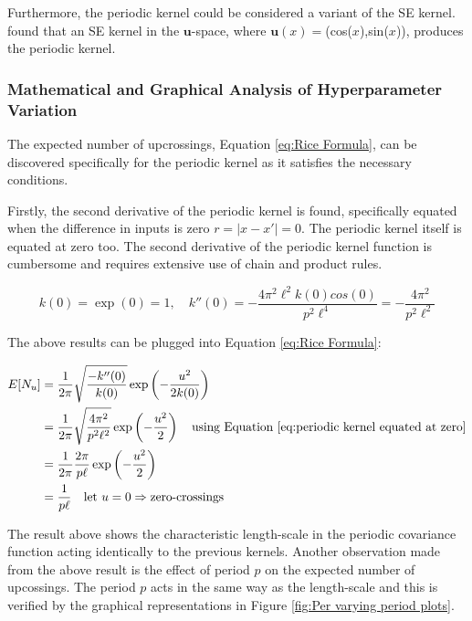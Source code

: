 \documentclass[12pt,a4paper]{article}
\begin{document}
Furthermore, the periodic kernel could be considered a variant of the SE kernel. \citet{mackay1998introduction} found that an SE kernel in the \(\mathbf{u}\)-space, where \(\mathbf{u}(x)=\)(cos(\(x\)),sin(\(x\))), produces the periodic kernel. 

\subsubsection{Mathematical and Graphical Analysis of Hyperparameter Variation}

The expected number of upcrossings, Equation \eqref{eq:Rice Formula}, can be discovered specifically for the periodic kernel as it satisfies the necessary conditions.

Firstly, the second derivative of the periodic kernel is found, specifically equated when the difference in inputs is zero \(r=|x-x'|=0\). The periodic kernel itself is equated at zero too. The second derivative of the periodic kernel function is cumbersome and requires extensive use of chain and product rules.  

\begin{equation}
k(0) = \exp(0) = 1,  \quad k''(0) = -\frac{4 \pi^2 \ell^2 k(0) cos(0)}{p^2 \ell^4} = -\frac{4 \pi^2 }{p^2 \ell^2}
\label{eq:periodic kernel equated at zero}
\end{equation}

The above results can be plugged into Equation \eqref{eq:Rice Formula}:

\begin{align*}
E[N_u] &= \frac{1}{2\pi} \sqrt{\frac{-k''(0)}{k(0)}} \exp\left(-\frac{u^2}{2k(0)}\right) \\
&= \frac{1}{2\pi} \sqrt{\frac{4 \pi^2 }{p^2 \ell^2}} \exp\left(-\frac{u^2}{2}\right) \quad \text{using Equation \eqref{eq:periodic kernel equated at zero}}\\
&= \frac{1}{2\pi} \frac{2 \pi }{p \ell} \exp\left(-\frac{u^2}{2}\right) \\
&= \frac{1}{p \ell} \quad \text{let } u=0 \Rightarrow \text{zero-crossings} 
\end{align*}

The result above shows the characteristic length-scale in the periodic covariance function acting identically to the previous kernels. Another observation made from the above result is the effect of period \(p\) on the expected number of upcossings. The period \(p\) acts in the same way as the length-scale and this is verified by the graphical representations in Figure \ref{fig:Per varying period plots}. 
\end{document}

